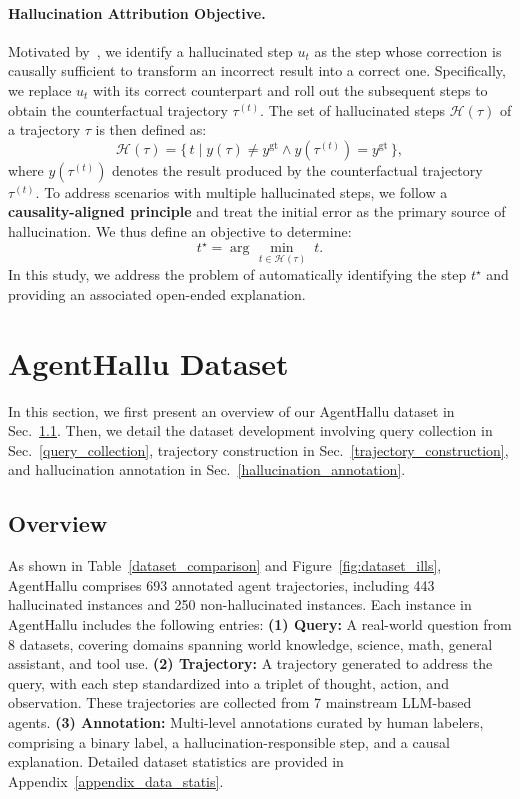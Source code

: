 \paragraph{Hallucination Attribution Objective.}
Motivated by~\cite{zhang2025agent}, we identify a hallucinated step $u_{t}$ as the step whose correction is causally sufficient to transform an incorrect result into a correct one. Specifically, we replace $u_{t}$ with its correct counterpart and roll out the subsequent steps to obtain the counterfactual trajectory $\tau^{(t)}$. The set of hallucinated steps $\mathcal{H}(\tau)$ of a trajectory $\tau$ is then defined as:
\begin{equation}
    \mathcal{H}(\tau) = \{\, t \mid y(\tau) \neq y^{\mathrm{gt}} \land y(\tau^{(t)}) = y^{\mathrm{gt}} \,\}, 
\end{equation}
where $y(\tau^{(t)})$ denotes the result produced by the counterfactual trajectory $\tau^{(t)}$.
To address scenarios with multiple hallucinated steps, we follow a \textbf{causality-aligned principle} and treat the initial error as the primary source of hallucination. We thus define an objective to determine:
\begin{equation}
    t^{\star}= \arg\min_{\, t \in \mathcal{H}(\tau)} \; t .
\end{equation}
In this study, we address the problem of automatically identifying the step $t^{\star}$ and providing an associated open-ended explanation.

\section{AgentHallu Dataset}
\label{sec:dataset}
In this section, we first present an overview of our AgentHallu dataset in Sec.~\ref{overview}. Then, we detail the dataset development involving query collection in Sec.~\ref{query_collection}, trajectory construction in Sec.~\ref{trajectory_construction}, and hallucination annotation in Sec.~\ref{hallucination_annotation}.

\subsection{Overview}
\label{overview}
As shown in Table~\ref{dataset_comparison} and Figure~\ref{fig:dataset_ills}, AgentHallu comprises 693 annotated agent trajectories, including 443 hallucinated instances and 250 non-hallucinated instances. Each instance in AgentHallu includes the following entries: \textbf{(1) Query:} A real-world question from 8 datasets, covering domains spanning world knowledge, science, math, general assistant, and tool use. \textbf{(2) Trajectory:} A trajectory generated to address the query, with each step standardized into a triplet of thought, action, and observation. These trajectories are collected from 7 mainstream LLM-based agents. \textbf{(3) Annotation:} Multi-level annotations curated by human labelers, comprising a binary label, a hallucination-responsible step, and a causal explanation. Detailed dataset statistics are provided in Appendix~\ref{appendix_data_statis}.

